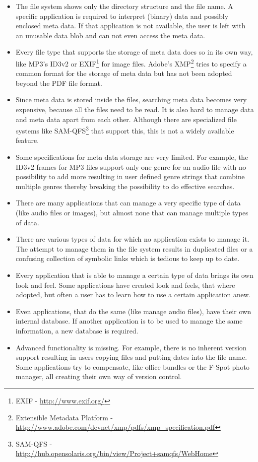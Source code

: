 \documentclass[12pt,a4paper,notitlepage,twocolumn,oneside]{article}
\begin{document}
\begin{itemize}
\item The file system shows only the directory structure and the file name. A specific application is required to interpret (binary) data and possibly enclosed meta data. If that application is not available, the user is left with an unusable data blob and can not even access the meta data.
\item Every file type that supports the storage of meta data does so in its own way, like MP3's ID3v2 or EXIF\footnote{EXIF - \url{http://www.exif.org/}} for image files. Adobe's XMP\footnote{Extensible Metadata Platform - \url{http://www.adobe.com/devnet/xmp/pdfs/xmp_specification.pdf}} tries to specify a common format for the storage of meta data but has not been adopted beyond the PDF file format.
\item Since meta data is stored inside the files, searching meta data becomes very expensive, because all the files need to be read. It is also hard to manage data and meta data apart from each other. Although there are specialized file systems like SAM-QFS\footnote{SAM-QFS - \url{http://hub.opensolaris.org/bin/view/Project+samqfs/WebHome}} that support this, this is not a widely available feature.
\item Some specifications for meta data storage are very limited. For example, the ID3v2 frames for MP3 files support only one genre for an audio file with no possibility to add more resulting in user defined genre strings that combine multiple genres thereby breaking the possibility to do effective searches.
\item There are many applications that can manage a very specific type of data (like audio files or images), but almost none that can manage multiple types of data.
\item There are various types of data for which no application exists to manage it. The attempt to manage them in the file system results in duplicated files or a confusing collection of symbolic links which is tedious to keep up to date.
\item Every application that is able to manage a certain type of data brings its own look and feel. Some applications have created look and feels, that where adopted, but often a user has to learn how to use a certain application anew.
\item Even applications, that do the same (like manage audio files), have their own internal database. If another application is to be used to manage the same information, a new database is required.
\item Advanced functionality is missing. For example, there is no inherent version support resulting in users copying files and putting dates into the file name. Some applications try to compensate, like office bundles or the F-Spot photo manager, all creating their own way of version control.
\end{itemize}
\end{document}
